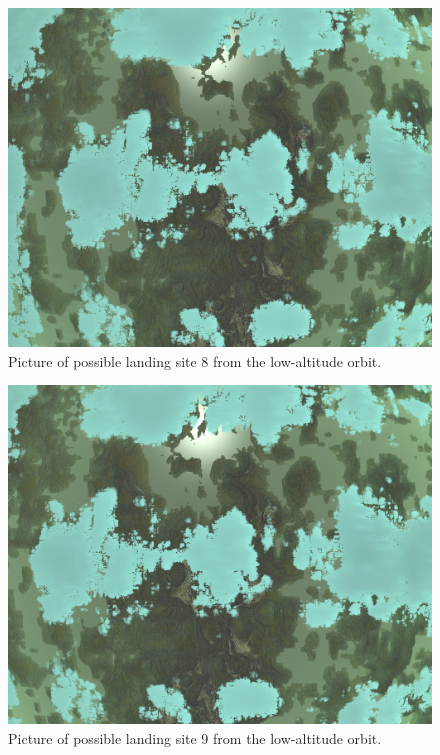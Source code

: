 \documentclass[reprint,english,notitlepage]{revtex4-2}
\begin{document}
    \begin{figure}[h]
        \centering
        \includegraphics[scale=0.14]{Figures/l_site8}
        \caption{Picture of possible landing site 8 from the low-altitude orbit.}\label{fig:l_site8}
    \end{figure}
    \begin{figure}[h]
        \centering
        \includegraphics[scale=0.14]{Figures/l_site9}
        \caption{Picture of possible landing site 9 from the low-altitude orbit.}\label{fig:l_site9}
    \end{figure}
\end{document}
